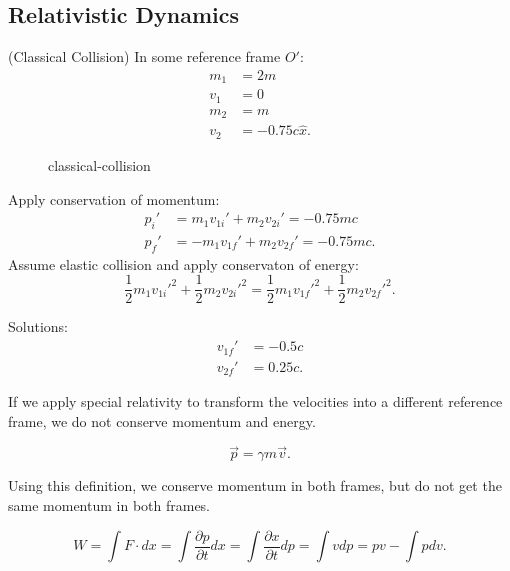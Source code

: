 
\subsection{Relativistic Dynamics}

\begin{example}(Classical Collision)
	In some reference frame $O'$:
	 \begin{align*}
		m_1 &=  2m \\
		v_1 &=  0 \\
		m_2 &= m \\
		v_2 &= -0.75 c \hat{x} 
	.\end{align*}

\begin{figure}[ht]
    \centering
    \caption{classical-collision}
    \label{fig:classical-collision}
\end{figure}

Apply conservation of momentum:
\begin{align*}
	p_i' &= m_1v_{1i}'+m_2 v_{2i}' = -0.75 m c \\
	p_f' &=  -m_1 v_{1f}' + m_2 v_{2f}'  = -0.75mc
.\end{align*}
Assume elastic collision and apply conservaton of energy:
\[
	\frac{1}{2} m_1 v_{1i}'^2 + 
\frac{1}{2} m_2 v_{2i}'^2 = 
\frac{1}{2} m_1 v_{1f}'^2 + 
\frac{1}{2} m_2 v_{2f}'^2 
.\] 

Solutions:
\begin{align*}
	v_{1f}'&=-0.5c\\
	v_{2f}'&=0.25c
.\end{align*}

\end{example}

\begin{problem}
	If we apply special relativity to transform the velocities into a different reference frame, we do not conserve momentum and energy.
\end{problem}

\begin{definition}
	\[
		\vec{p} = \gamma m \vec{v} 
	.\] 
\end{definition}
Using this definition, we conserve momentum in both frames, but do not get the same momentum in both frames.


\begin{theorem}
	\[
		W = \int F \cdot d x = \int \frac{\partial p}{\partial t} dx = \int \frac{\partial x}{\partial t} dp = \int v dp = pv - \int p dv
	.\] 
\end{theorem}

